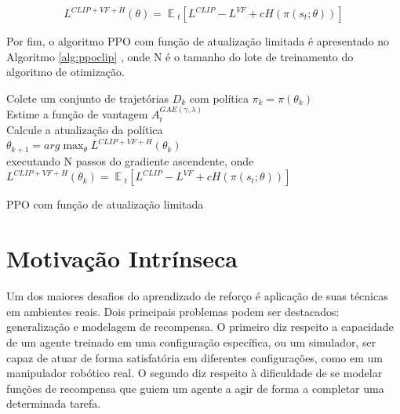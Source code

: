 \begin{equation}
\label{eqn:totalloss}
L^{CLIP + VF + H}(\theta) = \mathop{{}\mathbb{E}}{}_t [L^{CLIP} - L^{VF} + cH(\pi(s_t; \theta))]
\end{equation}

Por fim, o algoritmo PPO com função de atualização limitada é apresentado no Algoritmo \ref{alg:ppoclip} \cite{achiam}, onde N é o tamanho do lote de treinamento do algoritmo de otimização.

\medskip
\begin{center}
\begin{minipage}{0.92\textwidth}
\begin{algorithm2e}[H]
 \DontPrintSemicolon
   {Colete um conjunto de trajetórias $D_k$ com política $\pi_k = \pi(\theta_{k})$ \\
    Estime a função de vantagem $A_{t}^{GAE(\gamma, \lambda)}$ \\
    Calcule a atualização da política \\
    \hspace{2cm}$\theta_{k+1} = arg \max_{\theta} L^{CLIP + VF + H}(\theta_k)$ \\
    executando N passos do gradiente ascendente, onde \\
    \hspace{2cm}$L^{CLIP + VF + H}(\theta_k) = \mathop{{}\mathbb{E}}{}_t [L^{CLIP} - L^{VF} + cH(\pi(s_t; \theta))]$ 
   }
\caption{PPO com função de atualização limitada \label{alg:ppoclip} }
\end{algorithm2e}
\end{minipage}
\end{center}



\section{Motivação Intrínseca}
\label{sec:curiosidade}

Um dos maiores desafios do aprendizado de reforço é aplicação de suas técnicas em ambientes reais. Dois principais problemas podem ser destacados: generalização e modelagem de recompensa. O primeiro diz respeito a capacidade de um agente treinado em uma configuração específica, ou um simulador, ser capaz de atuar de forma satisfatória em diferentes configurações, como em um manipulador robótico real. O segundo diz respeito à dificuldade de se modelar funções de recompensa que guiem um agente a agir de forma a completar uma determinada tarefa.

